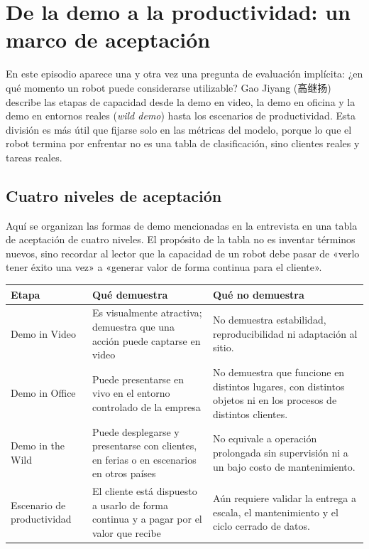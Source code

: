 \section{De la demo a la productividad: un marco de aceptación}

En este episodio aparece una y otra vez una pregunta de evaluación implícita: ¿en qué momento un robot puede considerarse utilizable? Gao Jiyang (高继扬) describe las etapas de capacidad desde la demo en video, la demo en oficina y la demo en entornos reales (\emph{wild demo}) hasta los escenarios de productividad. Esta división es más útil que fijarse solo en las métricas del modelo, porque lo que el robot termina por enfrentar no es una tabla de clasificación, sino clientes reales y tareas reales.

\subsection{Cuatro niveles de aceptación}

Aquí se organizan las formas de demo mencionadas en la entrevista en una tabla de aceptación de cuatro niveles. El propósito de la tabla no es inventar términos nuevos, sino recordar al lector que la capacidad de un robot debe pasar de «verlo tener éxito una vez» a «generar valor de forma continua para el cliente».

\begin{longtable}{p{}p{}p{}}
\toprule
Etapa & Qué demuestra & Qué no demuestra \\
\midrule
Demo in Video & Es visualmente atractiva; demuestra que una acción puede captarse en video & No demuestra estabilidad, reproducibilidad ni adaptación al sitio. \\
Demo in Office & Puede presentarse en vivo en el entorno controlado de la empresa & No demuestra que funcione en distintos lugares, con distintos objetos ni en los procesos de distintos clientes. \\
Demo in the Wild & Puede desplegarse y presentarse con clientes, en ferias o en escenarios en otros países & No equivale a operación prolongada sin supervisión ni a un bajo costo de mantenimiento. \\
Escenario de productividad & El cliente está dispuesto a usarlo de forma continua y a pagar por el valor que recibe & Aún requiere validar la entrega a escala, el mantenimiento y el ciclo cerrado de datos. \\
\bottomrule
\end{longtable}

